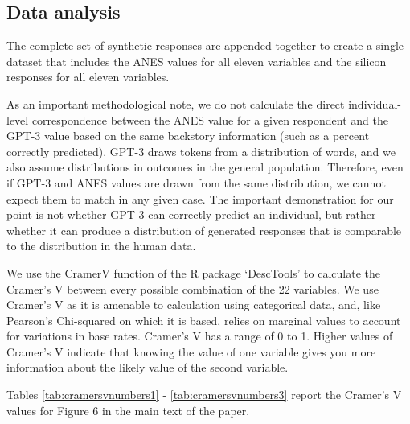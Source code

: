 \documentclass[11pt]{article}
\begin{document}
\newpage
\subsection{Data analysis}
The complete set of synthetic responses are appended together to create a single dataset that includes the ANES values for all eleven variables and the silicon responses for all eleven variables.

As an important methodological note, we do not calculate the direct individual-level correspondence between the ANES value for a given respondent and the GPT-3 value based on the same backstory information (such as a percent correctly predicted). GPT-3 draws tokens from a distribution of words, and we also assume distributions in outcomes in the general population. Therefore, even if GPT-3 and ANES values are drawn from the same distribution, we cannot expect them to match in any given case. The important demonstration for our point is not whether GPT-3 can correctly predict an individual, but rather whether it can produce a distribution of generated responses that is comparable to the distribution in the human data.

We use the CramerV function of the R package `DescTools' to calculate the Cramer's V between every possible combination of the 22 variables. We use Cramer's V as it is amenable to calculation using categorical data, and, like Pearson's Chi-squared on which it is based, relies on marginal values to account for variations in base rates. Cramer's V has a range of 0 to 1. Higher values of Cramer's V indicate that knowing the value of one variable gives you more information about the likely value of the second variable.

Tables \ref{tab:cramersvnumbers1} - \ref{tab:cramersvnumbers3} report the Cramer's V values for Figure 6 in the main text of the paper.
\end{document}
